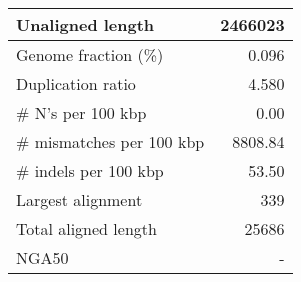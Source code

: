 \documentclass[12pt,a4paper]{article}
\begin{document}
\begin{table}[ht]
\begin{center}
\begin{tabular}{|l*{1}{|r}|}
Unaligned length & 2466023 \\ \hline
Genome fraction (\%) & 0.096 \\ \hline
Duplication ratio & 4.580 \\ \hline
\# N's per 100 kbp & 0.00 \\ \hline
\# mismatches per 100 kbp & 8808.84 \\ \hline
\# indels per 100 kbp & 53.50 \\ \hline
Largest alignment & 339 \\ \hline
Total aligned length & 25686 \\ \hline
NGA50 & - \\ \hline
\end{tabular}
\end{center}
\end{table}
\end{document}
